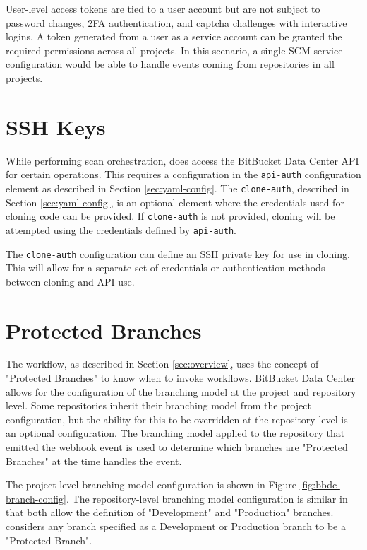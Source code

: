 User-level access tokens are tied to a user account but are not subject to password
changes, 2FA authentication, and captcha challenges with interactive logins.  A token generated
from a user as a service account can be granted the required permissions across all projects.
In this scenario, a single SCM service configuration would be able to handle events coming from
repositories in all projects.


\section{\cxoneflowtext\space SSH Keys}

While performing scan orchestration, \cxoneflow does access the BitBucket Data Center API for
certain operations.  This requires a configuration in the \texttt{api-auth} configuration
element as described in Section \ref{sec:yaml-config}.  The \texttt{clone-auth},
described in Section \ref{sec:yaml-config}, is an optional element where the credentials
used for cloning code can be provided.  If \texttt{clone-auth} is not provided, cloning will
be attempted using the credentials defined by \texttt{api-auth}.

The \texttt{clone-auth} configuration can define an SSH private key for use in cloning.  This
will allow for a separate set of credentials or authentication methods between cloning and
API use.


\section{Protected Branches}

The \cxoneflow workflow, as described in Section \ref{sec:overview}, uses the concept of "Protected Branches"
to know when to invoke workflows.  BitBucket Data Center allows for the configuration of the branching model
at the project and repository level.  Some repositories inherit their branching model from the project
configuration, but the ability for this to be overridden at the repository level is an optional configuration.
The branching model applied to the repository that emitted the webhook event is used to determine which branches
are "Protected Branches" at the time \cxoneflow handles the event.

The project-level branching model configuration is shown in Figure \ref{fig:bbdc-branch-config}.  The
repository-level branching model configuration is similar in that both allow the definition of
"Development" and "Production" branches.  \cxoneflow considers any branch specified as a Development
or Production branch to be a "Protected Branch".

